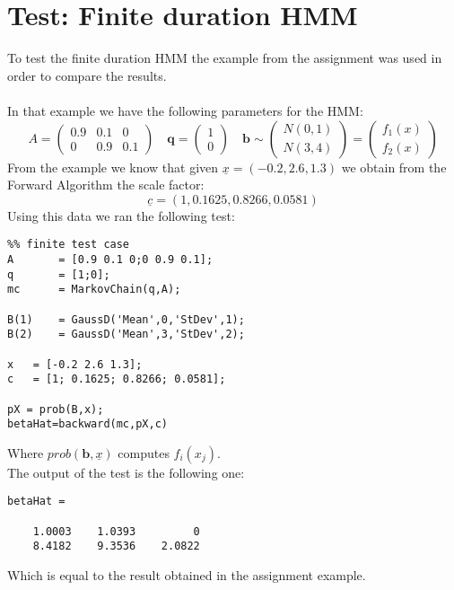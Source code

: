 \section{Test: Finite duration HMM}
To test the finite duration HMM the example from the assignment was used in order to compare the results.\\ \\
In that example we have the following parameters for the  HMM:
$$
A = 
 \begin{pmatrix}
  0.9 & 0.1 & 0 \\
  0 & 0.9 & 0.1
 \end{pmatrix} \quad
 \mathbf{q} = 
 \begin{pmatrix}
  1\\
  0
 \end{pmatrix} 
 \quad
 \mathbf{b} \sim
 \begin{pmatrix}
  \mathit{N}(0,1) \\
  \mathit{N}(3,4)
 \end{pmatrix}  = 
 \begin{pmatrix}
  f_1(x) \\
  f_2(x)
 \end{pmatrix}
 $$
From the example we know that given $\underline{x}=(-0.2,2.6,1.3)$ we obtain from the Forward Algorithm the scale factor: $$\underline{c} =(1,0.1625,0.8266,0.0581)$$
Using this data we ran the following test:
\begin{lstlisting}
%% finite test case
A       = [0.9 0.1 0;0 0.9 0.1];
q       = [1;0];
mc      = MarkovChain(q,A);

B(1)    = GaussD('Mean',0,'StDev',1);
B(2)    = GaussD('Mean',3,'StDev',2);

x   = [-0.2 2.6 1.3];
c   = [1; 0.1625; 0.8266; 0.0581];

pX = prob(B,x);
betaHat=backward(mc,pX,c)
\end{lstlisting}
Where $prob(\mathbf{b},\underline{x})$ computes $f_i(x_j)$.
\\
The output of the test is the following one:
\begin{lstlisting}
betaHat =

    1.0003    1.0393         0
    8.4182    9.3536    2.0822
\end{lstlisting}
Which is equal to the result obtained in the assignment example.